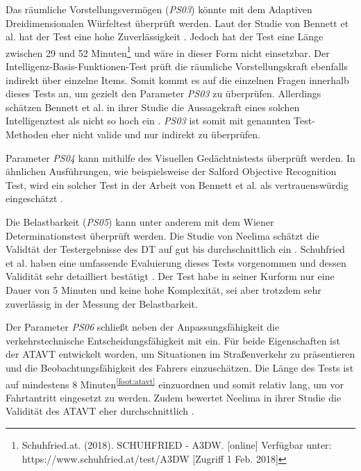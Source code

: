 Das räumliche Vorstellungsvermögen (\textit{PS03}) könnte mit dem Adaptiven Dreidimensionalen Würfeltest überprüft werden. Laut der Studie von Bennett et al. hat der Test eine hohe Zuverlässigkeit \cite{cognitivetestsfitnesstodrive}. Jedoch hat der Test eine Länge zwischen 29 und 52 Minuten\footnote{Schuhfried.at. (2018). SCHUHFRIED - A3DW. [online] Verfügbar unter: https://www.schuhfried.at/test/A3DW [Zugriff 1 Feb. 2018]} und wäre in dieser Form nicht einsetzbar. Der Intelligenz-Basis-Funktionen-Test prüft die räumliche Vorstellungskraft ebenfalls indirekt über einzelne Items. Somit kommt es auf die einzelnen Fragen innerhalb dieses Tests an, um gezielt den Parameter \textit{PS03} zu überprüfen. Allerdings schätzen Bennett et al. in ihrer Studie die Aussagekraft eines solchen Intelligenztest als nicht so hoch ein \cite{cognitivetestsfitnesstodrive}. \textit{PS03} ist somit mit genannten Test-Methoden eher nicht valide und nur indirekt zu überprüfen.

Parameter \textit{PS04} kann mithilfe des Visuellen Gedächtnistests überprüft werden. In ähnlichen Ausführungen, wie beispielsweise der Salford Objective Recognition Test, wird ein solcher Test in der Arbeit von Bennett et al. als vertrauenswürdig eingeschätzt \cite{cognitivetestsfitnesstodrive}.

Die Belastbarkeit (\textit{PS05})  kann unter anderem mit dem Wiener Determinationstest überprüft werden. Die Studie von Neelima schätzt die Validtät der Testergebnisse des DT auf gut bis durchschnittlich ein \cite{indiaassessment}. Schuhfried et al. haben eine umfassende Evaluierung dieses Tests vorgenommen und dessen Validität sehr detailliert bestätigt \cite{wiendt}. Der Test habe in seiner Kurform nur eine Dauer von 5 Minuten und keine hohe Komplexität, sei aber trotzdem sehr zuverlässig in der Messung der Belastbarkeit.

Der Parameter \textit{PS06} schließt neben der Anpassungsfähigkeit die verkehrstechnische Entscheidungsfähigkeit mit ein. Für beide Eigenschaften ist der ATAVT entwickelt worden, um Situationen im Straßenverkehr zu präsentieren und die Beobachtungsfähigkeit des Fahrers einzuschätzen. Die Länge des Tests ist auf mindestens 8 Minuten\textsuperscript{\ref{foot:atavt}}  einzuordnen und somit relativ lang, um vor Fahrtantritt eingesetzt zu werden. Zudem bewertet Neelima in ihrer Studie die Validität des ATAVT eher durchschnittlich \cite{indiaassessment}.

